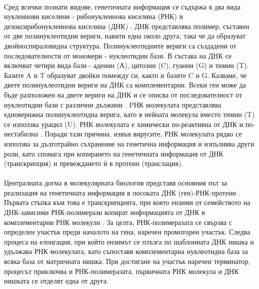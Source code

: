 \documentclass[pdftex,cyrillic,14pt,a4page,twoside,openright]{extreport}
\begin{document}
\paragraph{}
Сред всички познати видове, генетичната информация се съдържа в два вида нуклеинови киселини - рибонуклеинова киселина (РНК) и дезоксирибонуклеинова киселина (ДНК) \cite{houlihan2017}. ДНК представлява полимер, съставен от две полинуклеотидни вериги, навити една около друга, така че да образуват двойноспираловидна структура. Полинуклеотидните вериги са създадени от последователности от мономери - нуклеотидни бази. В състава на ДНК се включват четири вида бази - аденин (А), цитозин (C), гуанин (G) и тимин (T). Базите A и T образуват двойки помежду си, както и базите C и G. Казваме, че двете полинуклеотидни вериги на ДНК са комплементарни. Всеки ген може да бъде разположен на двете вериги на ДНК и се описва от последователност от нуклеотидни бази с различни дължини \cite{klug2014dna}. PНК молекулата представлява едноверижна полинуклеотидна верига, като в нейната молекула вместо тимин (T) се използва урацил (U). РНК молекулата е химически по-реактивна от ДНК и по-нестабилна \cite{soukup1999, cristescu2019}. Поради тази причина, извън вирусите, РНК молекулата рядко се използва за дълготрайно съхранение на генетична информация и изпълнява други роли, като спомага при копирането на генетичната информация от ДНК (транскрипция) и превеждането ѝ в протеин (транслация).

\paragraph{}
Централната догма в молекулярната биология представя основния път за реализация на генетичната информация в посоката ДНК (ген)-РНК-протеин \cite{crick1970central}. Първата стъпка към това е транскрипцията, при която ензими от семейството на ДНК-зависими РНК-полимерази копират информацията от ДНК в комплементарни РНК молекули \cite{sims2004}. За целта, РНК-полимеразата се свързва с определен участък преди началото на гена, наречен промоторен участък. Следва процеса на елонгация, при който ензимът се плъзга по шаблонната ДНК нишка и удължава РНК молекулата, като съпоставя комплементарна нуклеотидна база за всяка база от матричната нишка. При достигане на участък наречен терминатор, процесът приключва и РНК-полимеразата, първичната РНК молекула и ДНК нишката се отделят една от друга.
\end{document}
